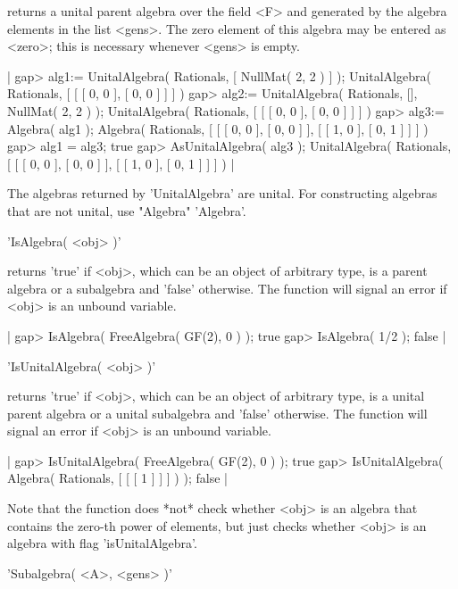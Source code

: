 returns a unital parent algebra over the field <F> and generated by the
algebra elements in the list <gens>.  The zero element of this algebra
may be entered as <zero>; this is necessary whenever <gens> is empty.

|    gap> alg1:= UnitalAlgebra( Rationals, [ NullMat( 2, 2 ) ] );
    UnitalAlgebra( Rationals, [ [ [ 0, 0 ], [ 0, 0 ] ] ] )
    gap> alg2:= UnitalAlgebra( Rationals, [], NullMat( 2, 2 ) );
    UnitalAlgebra( Rationals, [ [ [ 0, 0 ], [ 0, 0 ] ] ] )
    gap> alg3:= Algebra( alg1 );
    Algebra( Rationals, [ [ [ 0, 0 ], [ 0, 0 ] ], [ [ 1, 0 ], [ 0, 1 ] ]
     ] )
    gap> alg1 = alg3;
    true
    gap> AsUnitalAlgebra( alg3 );
    UnitalAlgebra( Rationals,
    [ [ [ 0, 0 ], [ 0, 0 ] ], [ [ 1, 0 ], [ 0, 1 ] ] ] ) |

The algebras returned by 'UnitalAlgebra' are unital.  For constructing
algebras that are not unital, use "Algebra" 'Algebra'.


'IsAlgebra( <obj> )'

returns 'true' if  <obj>, which can be  an object of  arbitrary type, is
a parent algebra or a subalgebra and 'false' otherwise.
The function will signal an error if <obj> is an unbound variable.

|    gap> IsAlgebra( FreeAlgebra( GF(2), 0 ) );
    true
    gap> IsAlgebra( 1/2 );
    false |


'IsUnitalAlgebra( <obj> )'

returns 'true' if  <obj>, which can be  an object of  arbitrary type, is
a unital parent algebra or a unital subalgebra and 'false' otherwise.
The function will signal an error if <obj> is an unbound variable.

|    gap> IsUnitalAlgebra( FreeAlgebra( GF(2), 0 ) );
    true
    gap> IsUnitalAlgebra( Algebra( Rationals, [ [ [ 1 ] ] ] ) );
    false |

Note that the function does *not* check whether <obj> is an algebra that
contains the zero-th power of elements, but just checks whether <obj> is
an algebra with flag 'isUnitalAlgebra'.


'Subalgebra( <A>, <gens> )'

